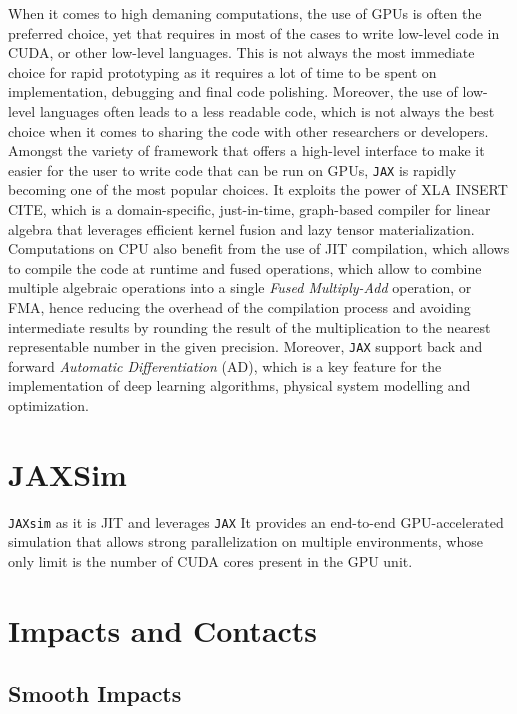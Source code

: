 When it comes to high demaning computations, the use of \ac{GPU}s is often the preferred choice, yet that requires in most of the cases to write low-level code in \ac{CUDA}, \cpp or other low-level languages. This is not always the most immediate choice for rapid prototyping as it requires a lot of time to be spent on implementation, debugging and final code polishing. Moreover, the use of low-level languages often leads to a less readable code, which is not always the best choice when it comes to sharing the code with other researchers or developers. Amongst the variety of framework that offers a high-level interface to make it easier for the user to write code that can be run on \ac{GPU}s, \texttt{JAX} \citep{bradbury_jax_2018} is rapidly becoming one of the most popular choices. It exploits the power of \ac{XLA} INSERT CITE, which is a domain-specific, just-in-time, graph-based compiler for linear algebra that leverages efficient kernel fusion and lazy tensor materialization.
Computations on \ac{CPU} also benefit from the use of \ac{JIT} compilation, which allows to compile the code at runtime and fused operations, which allow to combine multiple algebraic operations into a single \textit{Fused Multiply-Add} operation, or \ac{FMA}, hence reducing the overhead of the compilation process and avoiding intermediate results by rounding the result of the multiplication to the nearest representable number in the given precision.
Moreover, \texttt{JAX} support back and forward \textit{Automatic Differentiation} (\ac{AD}), which is a key feature for the implementation of deep learning algorithms, physical system modelling and optimization.

\section{JAXSim}

\texttt{JAXsim} \citep{ferigo_jaxsim_2022} as it is \ac{JIT} and leverages \texttt{JAX}
It provides an end-to-end GPU-accelerated simulation that allows strong parallelization on multiple environments, whose only limit is the number of \ac{CUDA} cores present in the GPU unit.

\section{Impacts and Contacts}

\subsection{Smooth Impacts}

